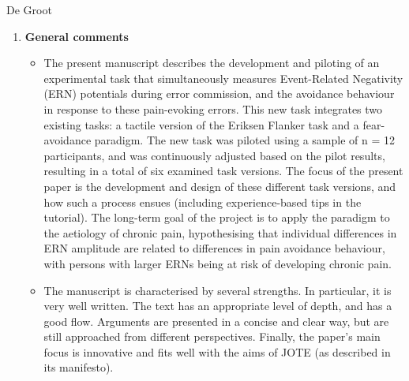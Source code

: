 \documentclass[twocolumn, serif, authordate, review]{jote-article}
\begin{document}
\begin{paracol}{2}
\begin{reviewend}{De Groot}
    \begin{enumerate}[label=\textbf{\arabic*}), start=0]
    \item \textbf{General comments}
        \begin{itemize}
            \item The present manuscript describes the development and piloting of an experimental task that simultaneously measures Event-Related Negativity (ERN) potentials during error commission, and the avoidance behaviour in response to these pain-evoking errors. This new task integrates two existing tasks: a tactile version of the Eriksen Flanker task and a fear-avoidance paradigm. The new task was piloted using a sample of n = 12 participants, and was continuously adjusted based on the pilot results, resulting in a total of six examined task versions. The focus of the present paper is the development and design of these different task versions, and how such a process ensues (including experience-based tips in the tutorial). The long-term goal of the project is to apply the paradigm to the aetiology of chronic pain, hypothesising that individual differences in ERN amplitude are related to differences in pain avoidance behaviour, with persons with larger ERNs being at risk of developing chronic pain.
            \item The manuscript is characterised by several strengths. In particular, it is very well written. The text has an appropriate level of depth, and has a good flow. Arguments are presented in a concise and clear way, but are still approached from different perspectives. Finally, the paper's main focus is innovative and fits well with the aims of JOTE (as described in its manifesto).
        \end{itemize}
    

\end{enumerate}
\end{reviewend}
\end{paracol}
\end{document}
